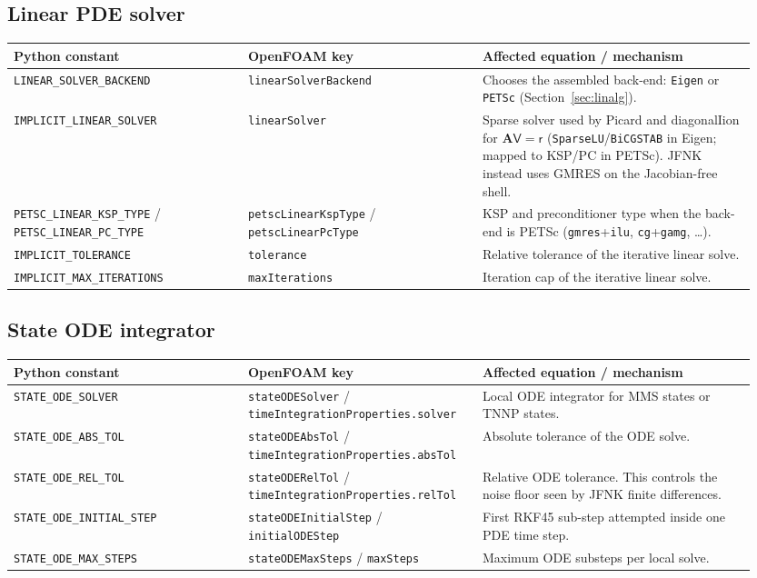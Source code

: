 \documentclass[11pt,a4paper]{article}
\newcommand{\code}[1]{\texttt{\small #1}}
\newcommand{\Aimp}{\mathbf{A}}
\begin{document}
\subsection{Linear PDE solver}
\begin{longtable}{@{}p{0.30\linewidth}p{0.30\linewidth}p{0.35\linewidth}@{}}
\toprule
Python constant & OpenFOAM key & Affected equation / mechanism \\
\midrule \endhead
\code{LINEAR\_SOLVER\_BACKEND} & \code{linearSolverBackend} &
   Chooses the assembled back-end: \code{Eigen} or \code{PETSc}
   (Section~\ref{sec:linalg}). \\
\code{IMPLICIT\_LINEAR\_SOLVER} & \code{linearSolver} &
   Sparse solver used by Picard and diagonalIion for
   $\Aimp\mathsf{V}=\mathsf{r}$ (\code{SparseLU}/\code{BiCGSTAB} in Eigen; mapped to
   KSP/PC in PETSc). JFNK instead uses GMRES on the Jacobian-free shell. \\
\code{PETSC\_LINEAR\_KSP\_TYPE} / \code{PETSC\_LINEAR\_PC\_TYPE} &
   \code{petscLinearKspType} / \code{petscLinearPcType} &
   KSP and preconditioner type when the back-end is PETSc
   (\code{gmres}+\code{ilu}, \code{cg}+\code{gamg}, \dots). \\
\code{IMPLICIT\_TOLERANCE} & \code{tolerance} &
   Relative tolerance of the iterative linear solve. \\
\code{IMPLICIT\_MAX\_ITERATIONS} & \code{maxIterations} &
   Iteration cap of the iterative linear solve. \\
\bottomrule
\end{longtable}

\subsection{State ODE integrator}
\begin{longtable}{@{}p{0.30\linewidth}p{0.30\linewidth}p{0.35\linewidth}@{}}
\toprule
Python constant & OpenFOAM key & Affected equation / mechanism \\
\midrule \endhead
\code{STATE\_ODE\_SOLVER} & \code{stateODESolver} /
   \code{timeIntegrationProperties.solver} &
   Local ODE integrator for MMS states or TNNP states. \\
\code{STATE\_ODE\_ABS\_TOL} & \code{stateODEAbsTol} /
   \code{timeIntegrationProperties.absTol} &
   Absolute tolerance of the ODE solve. \\
\code{STATE\_ODE\_REL\_TOL} & \code{stateODERelTol} /
   \code{timeIntegrationProperties.relTol} &
   Relative ODE tolerance. This controls the noise floor seen by JFNK
   finite differences. \\
\code{STATE\_ODE\_INITIAL\_STEP} & \code{stateODEInitialStep} /
   \code{initialODEStep} &
   First RKF45 sub-step attempted inside one PDE time step. \\
\code{STATE\_ODE\_MAX\_STEPS} & \code{stateODEMaxSteps} /
   \code{maxSteps} &
   Maximum ODE substeps per local solve. \\
\bottomrule
\end{longtable}
\end{document}
